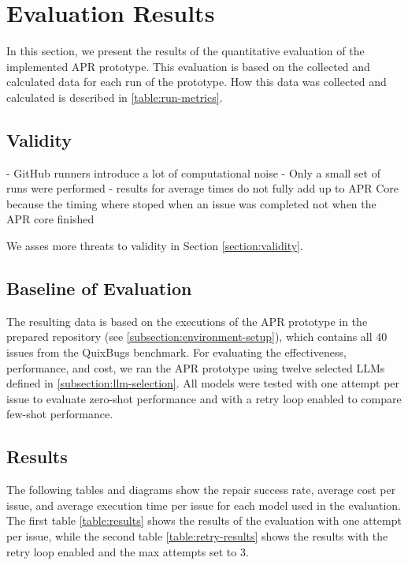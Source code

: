 \section{Evaluation Results} \label{section:evaluation-results}

In this section, we present the results of the quantitative evaluation of the implemented APR prototype. This evaluation is based on the collected and calculated data for each run of the prototype. How this data was collected and calculated is described in \ref{table:run-metrics}.

\subsection{Validity}

- GitHub runners introduce a lot of computational noise
- Only a small set of runs were performed
- results for average times do not fully add up to APR Core because the timing where stoped when an issue was completed not when the APR core finished

We asses more threats to validity in Section \ref{section:validity}.

\subsection{Baseline of Evaluation}

The resulting data is based on the executions of the APR prototype in the prepared repository (see \ref{subsection:environment-setup}), which contains all 40 issues from the QuixBugs benchmark. For evaluating the effectiveness, performance, and cost, we ran the APR prototype using twelve selected \acp{LLM} defined in \ref{subsection:llm-selection}. All models were tested with one attempt per issue to evaluate zero-shot performance and with a retry loop enabled to compare few-shot performance.

\subsection{Results}

The following tables and diagrams show the repair success rate, average cost per issue, and average execution time per issue for each model used in the evaluation. The first table \ref{table:results} shows the results of the evaluation with one attempt per issue, while the second table \ref{table:retry-results} shows the results with the retry loop enabled and the max attempts set to 3.

